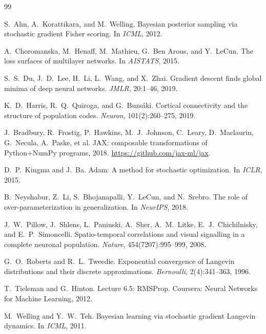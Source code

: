 \documentclass[12pt,letterpaper,twoside]{report}
\begin{document}
\begin{thebibliography}{99}

S.~Ahn, A.~Korattikara, and M.~Welling.
\newblock Bayesian posterior sampling via stochastic gradient Fisher scoring.
\newblock In \textit{ICML}, 2012.

A.~Choromanska, M.~Henaff, M.~Mathieu, G.~Ben Arous, and Y.~LeCun.
\newblock The loss surfaces of multilayer networks.
\newblock In \textit{AISTATS}, 2015.

S.~S.~Du, J.~D.~Lee, H.~Li, L.~Wang, and X.~Zhai.
\newblock Gradient descent finds global minima of deep neural networks.
\newblock \textit{JMLR}, 20:1--46, 2019.

K.~D.~Harris, R.~Q.~Quiroga, and G.~Buzs\'{a}ki.
\newblock Cortical connectivity and the structure of population codes.
\newblock \textit{Neuron}, 101(2):260--275, 2019.

J.~Bradbury, R.~Frostig, P.~Hawkins, M.~J.~Johnson, C.~Leary, D.~Maclaurin, G.~Necula, A.~Paske, et al.
\newblock JAX: composable transformations of Python+NumPy programs, 2018.
\newblock \url{https://github.com/jax-ml/jax}.

D.~P.~Kingma and J.~Ba.
\newblock Adam: A method for stochastic optimization.
\newblock In \textit{ICLR}, 2015.

B.~Neyshabur, Z.~Li, S.~Bhojanapalli, Y.~LeCun, and N.~Srebro.
\newblock The role of over-parameterization in generalization.
\newblock In \textit{NeurIPS}, 2018.

J.~W.~Pillow, J.~Shlens, L.~Paninski, A.~Sher, A.~M.~Litke, E.~J.~Chichilnisky, and E.~P.~Simoncelli.
\newblock Spatio-temporal correlations and visual signalling in a complete neuronal population.
\newblock \textit{Nature}, 454(7207):995--999, 2008.

G.~O.~Roberts and R.~L.~Tweedie.
\newblock Exponential convergence of Langevin distributions and their discrete approximations.
\newblock \textit{Bernoulli}, 2(4):341--363, 1996.

T.~Tieleman and G.~Hinton.
\newblock Lecture 6.5: RMSProp.
\newblock Coursera: Neural Networks for Machine Learning, 2012.

M.~Welling and Y.~W.~Teh.
\newblock Bayesian learning via stochastic gradient Langevin dynamics.
\newblock In \textit{ICML}, 2011.

\end{thebibliography}
\end{document}
